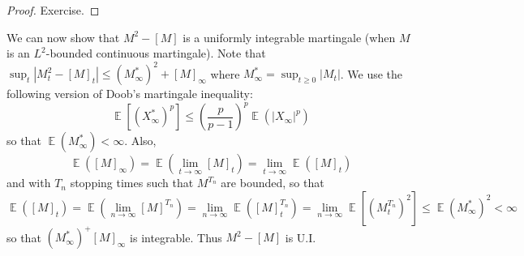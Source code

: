 \documentclass[11pt, a4paper]{memoir}
\theoremstyle{change}
\theoremstyle{plain}
\theoremstyle{nonumberplain}
\newtheorem{proof}{Proof}
\DeclareMathOperator{\E}{{\mathbb{E}}}
\numberwithin{equation}{section}
\begin{document}
\begin{proof}
    Exercise.
\end{proof}
We can now show that $M^2-[M]$ is a uniformly integrable martingale (when $M$ is an $L^2$-bounded continuous martingale).
Note that $\sup_t|M_t^2-[M]_t|\leq (M^*_\infty)^2+[M]_\infty$ where $M^*_\infty=\sup_{t\geq 0}|M_t|$.
We use the following version of Doob's martingale inequality:
\begin{equation*}
    \E[(X_\infty^*)^p]\leq\left(\frac{p}{p-1}\right)^p\E(|X_\infty|^p)
\end{equation*}
so that $\E(M_\infty^*)<\infty$.
Also,
\begin{equation*}
    \E([M]_\infty)=\E(\lim_{t\to\infty}[M]_t)=\lim_{t\to\infty}\E([M]_t)
\end{equation*}
and with $T_n$ stopping times such that $M^{T_n}$ are bounded, so that
\begin{equation*}
    \E([M]_t)=\E(\lim_{n\to\infty}[M]^{T_n})=\lim_{n\to\infty}\E([M]_t^{T_n}) = \lim_{n\to\infty}\E[(M_t^{T_n})^2]\leq\E(M_\infty^*)^2<\infty
\end{equation*}
so that $(M_\infty^*)^+[M]_\infty$ is integrable.
Thus $M^2-[M]$ is U.I.
\end{document}
